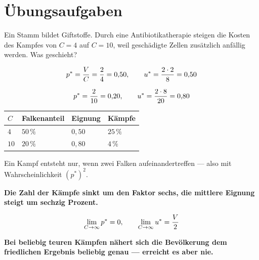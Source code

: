 \section{Übungsaufgaben}

\begin{aufgabe}
Ein Stamm bildet Giftstoffe. Durch eine Antibiotikatherapie steigen die Kosten des Kampfes von $C=4$ auf $C=10$, weil geschädigte Zellen zusätzlich anfällig werden. Was geschieht?

\loesung
{}
\[ p^{*} = \frac{V}{C} = \frac{2}{4} = 0{,}50, \qquad u^{*} = \frac{2\cdot2}{8} = 0{,}50 \]

\[ p^{*} = \frac{2}{10} = 0{,}20, \qquad u^{*} = \frac{2\cdot8}{20} = 0{,}80 \]

\begin{center}
{\small
\renewcommand{\arraystretch}{1.5}
\begin{tabular}{@{}P{1.6cm}P{2.0cm}P{2.0cm}P{2.2cm}@{}}
\toprule
$C$ & \textbf{Falkenanteil} & \textbf{Eignung} & \textbf{Kämpfe}\\
\midrule
$4$ & $50\,\%$ & $0{,}50$ & $25\,\%$\\
$10$ & $20\,\%$ & $0{,}80$ & $4\,\%$\\
\bottomrule
\end{tabular}}
\end{center}

 Ein Kampf entsteht nur, wenn zwei Falken aufeinandertreffen --- also mit Wahrscheinlichkeit $(p^{*})^{2}$.

\begin{center}
\begin{minipage}{0.9\textwidth}
\textbf{Die Zahl der Kämpfe sinkt um den Faktor sechs, die mittlere Eignung steigt um sechzig Prozent.}
\end{minipage}
\end{center}

\[ \lim_{C\to\infty} p^{*} = 0, \qquad \lim_{C\to\infty} u^{*} = \frac{V}{2} \]

\begin{center}
\begin{minipage}{0.9\textwidth}
\textbf{Bei beliebig teuren Kämpfen nähert sich die Bevölkerung dem friedlichen Ergebnis beliebig genau --- erreicht es aber nie.}
\end{minipage}
\end{center}


\end{aufgabe}
